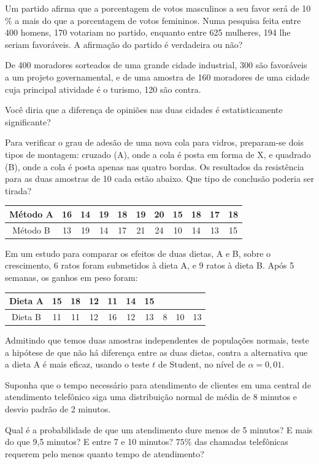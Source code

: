 \documentclass{report}
\begin{document}
\begin{Exercise}
\Question Um partido afirma que a porcentagem de votos masculinos a seu favor será de 10 \% a mais do que a porcentagem de votos femininos. Numa pesquisa feita entre 
400 homens, 170 votariam no partido, enquanto entre 625 mulheres, 194 lhe seriam favoráveis. A afirmação do partido é verdadeira ou não?

\Question De 400 moradores sorteados de uma grande cidade industrial, 300 são favoráveis a um projeto governamental, e de uma amostra de 160 moradores de uma cidade 
cuja principal atividade é o turismo, 120 são contra.
\begin{tasks}
\task Você diria que a diferença de opiniões nas duas cidades é estatisticamente significante?
\end{tasks}
\Question Para verificar o grau de adesão de uma nova cola para vidros, preparam-se dois tipos de montagem: cruzado (A), onde a cola é posta em forma de X, e quadrado (B), 
onde a cola é posta apenas nas quatro bordas. Os resultados da resistência para as duas amostras de 10 cada estão abaixo. Que tipo de conclusão poderia ser tirada?

\begin{tabular}{c|c|c|c|c|c|c|c|c|c|c} \hline
Método A & 16 & 14 & 19 & 18 & 19 & 20 & 15 & 18 & 17 & 18 \\ \hline
Método B & 13 & 19 & 14 & 17 & 21 & 24 & 10 & 14 & 13 & 15 \\ \hline
\end{tabular}

\Question Em um estudo para comparar os efeitos de duas dietas, A e B, sobre o crescimento, 6 ratos foram submetidos à dieta A, e 9 ratos à dieta B. Após 5 semanas, os 
ganhos em peso foram:

\begin{tabular}{c|c|c|c|c|c|c|c|c|c} \hline
Dieta A & 15 & 18 & 12 & 11 & 14 & 15 &  & &  \\ \hline
Dieta B & 11 & 11 & 12 & 16 & 12 & 13 & 8 & 10 & 13  \\ \hline
\end{tabular}
\begin{tasks}
\task Admitindo que temos duas amostras independentes de populações normais, teste a hipótese de que não há diferença entre as duas dietas, contra a alternativa que a 
dieta A é mais eficaz, usando o teste $t$ de Student, no nível de $\alpha = 0,01$.
\end{tasks}

\newpage

\Question Suponha que o tempo necessário para atendimento de clientes em uma central de atendimento telefônico siga uma distribuição normal de média de 8 minutos 
e desvio padrão de 2 minutos.
\begin{tasks}
\task Qual é a probabilidade de que um atendimento dure menos de 5 minutos?
\task E  mais do que 9,5 minutos?
\task E entre 7 e 10 minutos?
\task $75\%$ das chamadas telefônicas requerem pelo menos quanto tempo de atendimento?
\end{tasks}


\end{Exercise}
\end{document}
